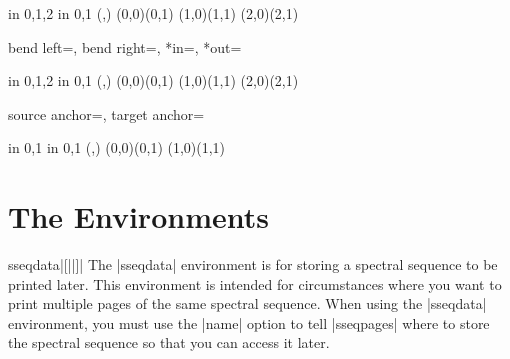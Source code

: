 \documentclass{ltxdoc}
\newenvironment{manualentry}[1]{
    \begin{pgfmanualentry}
    \pgfmanualentryheadline{#1}
    \pgfmanualbody
}{
    \end{pgfmanualentry}
}
\begin{document}
\begin{sseqdata}[name=ex1,degree={#1}{1-#1}]
\begin{manualentry}{Colors and dash patterns:}
\begin{codeexample}[]
\begin{sseqpage}[background color=graphicbackground, no axes]
\foreach\x in {0,1,2} \foreach\y in {0,1}{
    \class(\x,\y)
}
(0,0)(0,1)
(1,0)(1,1)
(2,0)(2,1)
\end{sseqpage}
\end{codeexample}
%
\end{manualentry}

\begin{keylist}{bend left=, bend right=, *in=, *out=}
\begin{codeexample}[]
\begin{sseqpage}[background color=graphicbackground, no axes]
\foreach\x in {0,1,2} \foreach\y in {0,1}{
    \class(\x,\y)
}
\structline[bend left=20](0,0)(0,1)
\structline[bend right=20](1,0)(1,1)
\structline[in=20,out=north](2,0)(2,1)
\end{sseqpage}
\end{codeexample}
\end{keylist} 

\begin{keylist}{source anchor=, target anchor=}
\begin{codeexample}[]
\begin{sseqpage}[background color=graphicbackground, no axes]
\foreach\x in {0,1} \foreach\y in {0,1}{
    \class(\x,\y)
}
\structline(0,0)(0,1)
\structline[source anchor=north west,target anchor=-30](1,0)(1,1)
\end{sseqpage}
\end{codeexample}
\end{keylist}

\section{The Environments}
\begin{environment}{{sseqdata}|[||]|}
The |sseqdata| environment is for storing a spectral sequence to be printed later. This environment is intended for circumstances where you want to print multiple pages of the same spectral sequence. When using the |sseqdata| environment, you must use the |name| option to tell |sseqpages| where to store the spectral sequence so that you can access it later. 


\end{environment}
\end{sseqdata}
\end{document}
